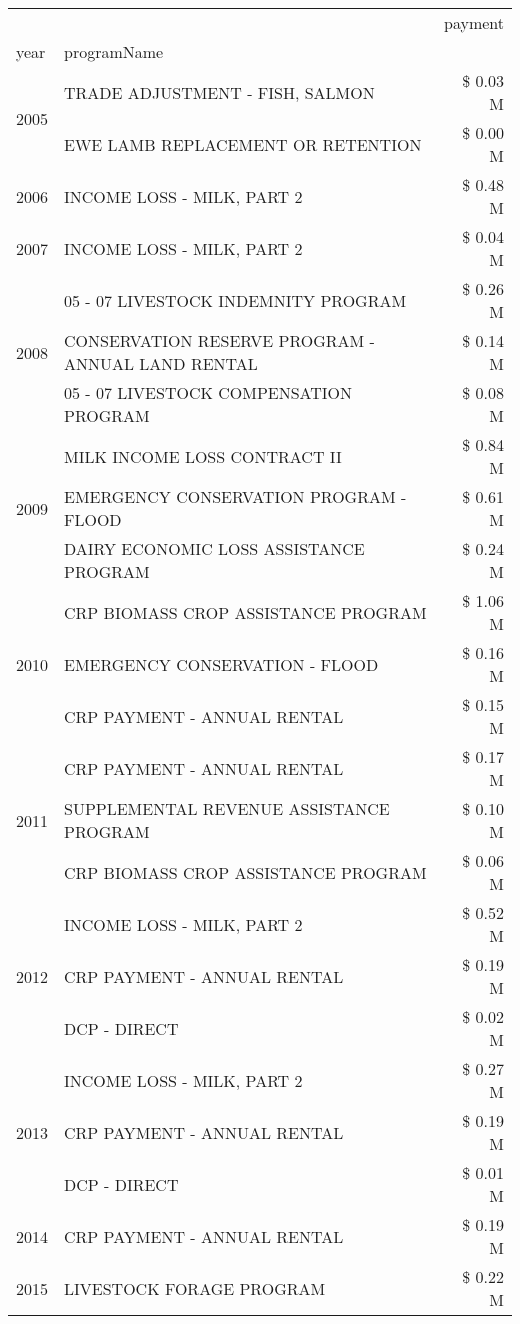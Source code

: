 \begin{tabular}{llr}
\toprule
 &  & payment \\
year & programName &  \\
\midrule
\multirow[t]{2}{*}{2005} & TRADE ADJUSTMENT - FISH, SALMON & \$ 0.03 M \\
 & EWE LAMB REPLACEMENT OR RETENTION & \$ 0.00 M \\
\cline{1-3}
2006 & INCOME LOSS - MILK, PART 2 & \$ 0.48 M \\
\cline{1-3}
2007 & INCOME LOSS - MILK, PART 2 & \$ 0.04 M \\
\cline{1-3}
\multirow[t]{3}{*}{2008} & 05 - 07 LIVESTOCK INDEMNITY PROGRAM & \$ 0.26 M \\
 & CONSERVATION RESERVE PROGRAM - ANNUAL LAND RENTAL & \$ 0.14 M \\
 & 05 - 07 LIVESTOCK COMPENSATION PROGRAM & \$ 0.08 M \\
\cline{1-3}
\multirow[t]{3}{*}{2009} & MILK INCOME LOSS CONTRACT II & \$ 0.84 M \\
 & EMERGENCY CONSERVATION PROGRAM - FLOOD & \$ 0.61 M \\
 & DAIRY ECONOMIC LOSS ASSISTANCE PROGRAM & \$ 0.24 M \\
\cline{1-3}
\multirow[t]{3}{*}{2010} & CRP BIOMASS CROP ASSISTANCE PROGRAM & \$ 1.06 M \\
 & EMERGENCY CONSERVATION - FLOOD & \$ 0.16 M \\
 & CRP PAYMENT - ANNUAL RENTAL & \$ 0.15 M \\
\cline{1-3}
\multirow[t]{3}{*}{2011} & CRP PAYMENT - ANNUAL RENTAL & \$ 0.17 M \\
 & SUPPLEMENTAL REVENUE ASSISTANCE PROGRAM & \$ 0.10 M \\
 & CRP BIOMASS CROP ASSISTANCE PROGRAM & \$ 0.06 M \\
\cline{1-3}
\multirow[t]{3}{*}{2012} & INCOME LOSS - MILK, PART 2 & \$ 0.52 M \\
 & CRP PAYMENT - ANNUAL RENTAL & \$ 0.19 M \\
 & DCP - DIRECT & \$ 0.02 M \\
\cline{1-3}
\multirow[t]{3}{*}{2013} & INCOME LOSS - MILK, PART 2 & \$ 0.27 M \\
 & CRP PAYMENT - ANNUAL RENTAL & \$ 0.19 M \\
 & DCP - DIRECT & \$ 0.01 M \\
\cline{1-3}
2014 & CRP PAYMENT - ANNUAL RENTAL & \$ 0.19 M \\
\cline{1-3}
\multirow[t]{2}{*}{2015} & LIVESTOCK FORAGE PROGRAM & \$ 0.22 M \\

\end{tabular}
